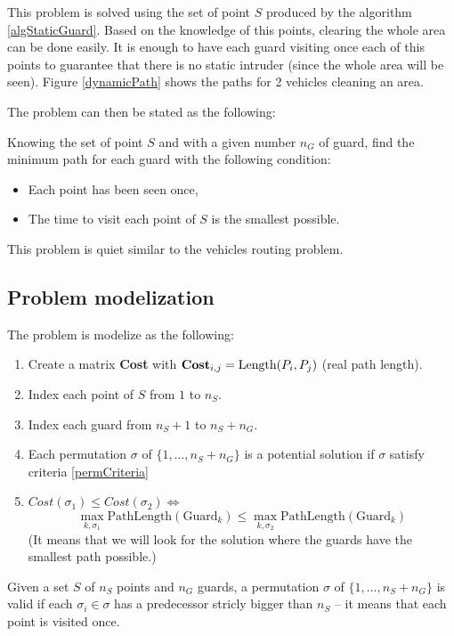 This problem is solved using the set of point $S$ produced by the algorithm \ref{algStaticGuard}. Based on the knowledge of this points, clearing the whole area can be done easily. It is enough to have each guard visiting once each of this points to guarantee that there is no static intruder (since the whole area will be seen). Figure \ref{dynamicPath} shows the paths for 2 vehicles cleaning an area.

The problem can then be stated as the following:

\begin{subproblem}
 Knowing the set of point $S$ and with a given number $n_{G}$ of guard, find the minimum path for each guard with the following condition:
 \begin{itemize}
  \item Each point has been seen once,
  \item The time to visit each point of $S$ is the smallest possible.
 \end{itemize}
This problem is quiet similar to the vehicles routing problem.
\label{subProb3}
\end{subproblem}

\subsection{Problem modelization}

The problem is modelize as the following:

\begin{enumerate}
  \item Create a matrix \textbf{Cost} with $\text{\textbf{Cost}}_{i,j} = \text{Length}(P_i,P_j)$ (real path length).
  \item Index each point of $S$ from $1$ to $n_{S}$.
  \item Index each guard from $n_{S}+1$ to $ n_{S}+n_{G}$.
  \item Each permutation $\sigma$ of $\{1,\hdots,n_{S}+n_{G}\}$ is a potential solution if $\sigma$ satisfy criteria \ref{permCriteria}
  \item $Cost(\sigma_1) \leq Cost(\sigma_2) \Longleftrightarrow$ $$\max_{k,\sigma_1}\text{PathLength}(\text{Guard}_k) \leq \max_{k,\sigma_2}\text{PathLength}(\text{Guard}_k)$$
  (It means that we will look for the solution where the guards have the smallest path possible.)
\end{enumerate}

\begin{criteria}
 Given a set $S$ of $n_S$ points and $n_G$ guards, a permutation $\sigma$ of $\{1,\hdots,n_S+n_G\}$ is valid if each $\sigma_i \in \sigma$ has a predecessor stricly bigger than $n_S$  -- it means that each point is visited once.
 \label{permCriteria}
\end{criteria}


